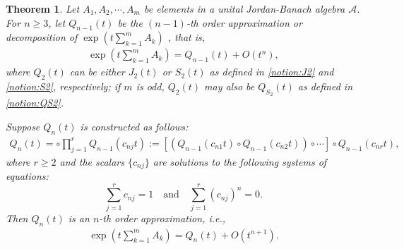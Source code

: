 \documentclass{article}
\theoremstyle{plain} %
\newtheorem{thm}{Theorem}[section]
\numberwithin{equation}{section}
\begin{document}
\begin{thm}\label{thm:Trotter:higher:JordanBanach}
    Let $A_1, A_2,\cdots, A_m$ be elements in a unital Jordan-Banach algebra $\mathcal{A}$. For $n\ge 3$, let $Q_{n-1}(t)$ be the $(n-1)$-th order approximation or decomposition of $\exp\left(t\sum_{k=1}^m A_k\right)$ , that is, 
    \begin{align} \label{eqt:n-1:approximate}
       \exp\left(t\sum_{k=1}^m A_k\right)=Q_{n-1}(t)+O(t^n),
    \end{align}
    where $Q_2(t)$ can be either $J_2(t)$ or $S_2(t)$ as defined in {\rm \cref{notion:J2}} and {\rm \cref{notion:S2}}, respectively; if $m$ is odd, $Q_2(t)$ may also be $Q_{S_2}(t)$ as defined in {\rm\cref{notion:QS2}}.
   
Suppose $Q_n(t)$ is constructed as follows:
\begin{align}\label{eq:non-symmetric:approximant}
    Q_n(t)= \circ \prod_{j=1}^r Q_{n-1}(c_{nj} t) :=\left[\left(Q_{n-1}(c_{n1} t)\circ Q_{n-1}(c_{n2} t)\right)\circ \cdots\right]\circ Q_{n-1}(c_{nr} t),   
\end{align}
where $r\geq 2$ and the scalars $\{c_{nj}\}$ are solutions to the following systems of equations: 
\begin{equation}\label{eqt:norder}
    \sum_{j=1}^r c_{nj}=1\quad\mbox{and}\quad\sum_{j=1}^r (c_{nj})^n=0.	
\end{equation}
Then  $Q_n(t)$ is an $n$-th order approximation, i.e., 
\begin{align} \label{eqt:norder:approximate}
       \exp\left(t\sum_{k=1}^m A_k\right)=Q_{n}(t)+O(t^{n+1}). 
    \end{align}
\end{thm}
\end{document}
